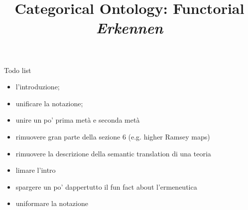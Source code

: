 \documentclass[a4paper]{../birkjour}
\title{Categorical Ontology: Functorial \emph{Erkennen}}
\newcommand{\fo}[1]{{\color{red} #1}}
\begin{document}

\maketitle

{\footnotesize\tableofcontents}
\newpage

\fo{Todo list
  \begin{itemize}
    \item l'introduzione;
    \item unificare la notazione;
    \item unire un po' prima metà e seconda metà
    \item rimuovere gran parte della sezione 6 (e.g. higher Ramsey maps)
    \item rimuovere la descrizione della semantic translation di una teoria
    \item limare l'intro
    \item spargere un po' dappertutto il fun fact about l'ermeneutica
    \item uniformare la notazione
  \end{itemize}
}








{}

\end{document}
